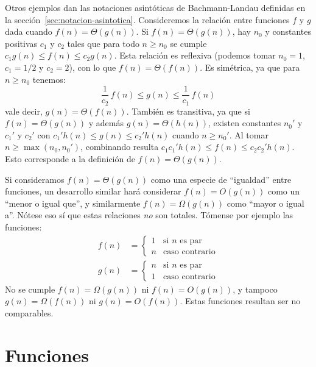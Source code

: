   Otros ejemplos dan las notaciones asintóticas de Bachmann-Landau%
  definidas en la sección~\ref{sec:notacion-asintotica}.
  Consideremos la relación entre funciones \(f\) y \(g\)
  dada cuando \(f(n) = \Theta(g(n))\).
  Si \(f(n) = \Theta(g(n))\),
  hay \(n_0\) y constantes positivas \(c_1\) y \(c_2\)
  tales que para todo \(n \ge n_0\)
  se cumple \(c_1 g(n) \le f(n) \le c_2 g(n)\).
  Esta relación es reflexiva
  (podemos tomar \(n_0 = 1\), \(c_1 = 1/2\) y \(c_2 = 2\)),
  con lo que \(f(n) = \Theta(f(n))\).
  Es simétrica,
  ya que para \(n \ge n_0\) tenemos:
  \begin{equation*}
    \frac{1}{c_2} \, f(n) \le g(n) \le \frac{1}{c_1} \, f(n)
  \end{equation*}
  vale decir,
  \(g(n) = \Theta(f(n))\).
  También es transitiva,
  ya que si \(f(n) = \Theta(g(n))\)
  y además \(g(n) = \Theta(h(n))\),
  existen constantes \(n_0'\) y \(c_1'\) y \(c_2'\)
  con \(c_1' h(n) \le g(n) \le c_2' h(n)\) cuando \(n \ge n_0'\).
  Al tomar \(n \ge \max(n_0, n_0')\),
  combinando resulta
  \(c_1 c_1' h(n) \le f(n) \le c_2 c_2' h(n)\).
  Esto corresponde a la definición de \(f(n) = \Theta(g(n))\).

  Si consideramos \(f(n) = \Theta(g(n))\)
  como una especie de ``igualdad'' entre funciones,
  un desarrollo similar hará considerar \(f(n) = O(g(n))\)
  como un ``menor o igual que'',
  y similarmente \(f(n) = \Omega(g(n))\) como ``mayor o igual a''.
  Nótese eso sí que estas relaciones \emph{no} son totales.
  Tómense por ejemplo las funciones:
  \begin{align*}
    f(n)
      &= \begin{cases}
	   1 & \text{si \(n\) es par} \\
	   n & \text{caso contrario}
	 \end{cases}\\
    g(n)
      &= \begin{cases}
	   n & \text{si \(n\) es par} \\
	   1 & \text{caso contrario}
	 \end{cases}
  \end{align*}
  No se cumple \(f(n) = \Omega(g(n))\)
  ni \(f(n) = O(g(n))\),
  y tampoco \(g(n) = \Omega(f(n))\)
  ni \(g(n) = O(f(n))\).
  Estas funciones resultan ser no comparables.

\section{Funciones}
\label{sec:funciones}

